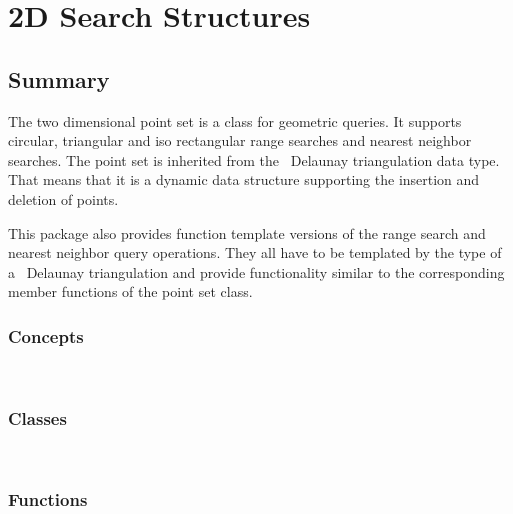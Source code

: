 

\ccParDims


\chapter{2D Search Structures}

\section*{Summary}

The two dimensional point set is a class for geometric queries.
It supports circular, triangular and iso rectangular range searches and
nearest neighbor searches.
The point set is inherited from the \cgal\ Delaunay triangulation data type.
That means that it is a dynamic data structure supporting the insertion and
deletion of points. 

This package also provides function template versions of the range search and nearest
neighbor query operations. They all have to be templated by the type of a \cgal\
Delaunay triangulation and provide functionality similar to the corresponding
member functions of the point set class.

\subsection*{Concepts}
\\

\subsection*{Classes}
\\

\subsection*{Functions}
\\
\\
\\

